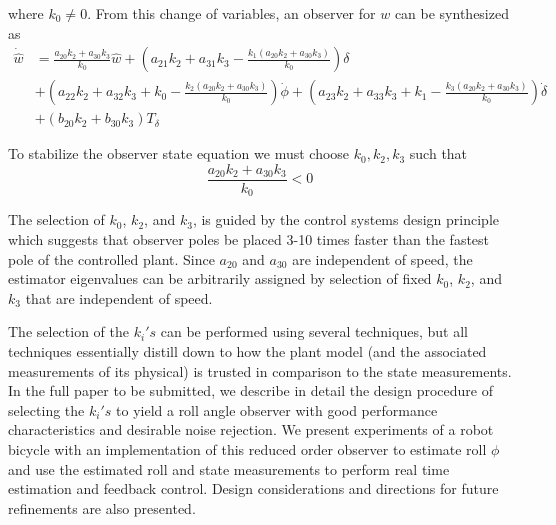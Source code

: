 \documentclass[letterpaper,11pt]{article}
\begin{document}
where $k_0\ne0$.  From this change of variables, an observer for $w$ can be
synthesized as
\begin{align*}
\dot{\hat{w}} &= \frac{a_{20} k_{2} + a_{30} k_{3}}{k_{0}} \hat{w}
 + \left(a_{21} k_{2} + a_{31} k_{3} - \frac{k_{1} \left(a_{20} k_{2} + a_{30} k_{3}\right)}{k_{0}}\right) \delta \\
 &+ \left(a_{22} k_{2} + a_{32} k_{3} + k_{0} - \frac{k_{2} \left(a_{20} k_{2} + a_{30} k_{3}\right)}{k_{0}}\right) \dot{\phi}
 + \left(a_{23} k_{2} + a_{33} k_{3} + k_{1} - \frac{k_{3} \left(a_{20} k_{2} + a_{30} k_{3}\right)}{k_{0}}\right) \dot{\delta} \\
 &+ \left(b_{20} k_{2} + b_{30} k_{3}\right) T_\delta
\end{align*}

To stabilize the observer state equation we must choose $k_0, k_2, k_3$ such
that
\begin{equation*}
\frac{a_{20} k_{2} + a_{30} k_{3}}{k_{0}} < 0
\end{equation*}

The selection of $k_0$, $k_2$, and $k_3$, is guided by the control systems
design principle which suggests that observer poles be placed 3-10 times faster
than the fastest pole of the controlled plant. Since $a_{20}$ and $a_{30}$ are
independent of speed, the estimator eigenvalues can be arbitrarily assigned by
selection of fixed $k_0$, $k_2$, and $k_3$ that are independent of speed.

The selection of the $k_i's$ can be performed using several techniques, but all
techniques essentially distill down to how the plant model (and the associated
measurements of its physical) is trusted in comparison to the state
measurements. In the full paper to be submitted, we describe in detail the
design procedure of selecting the $k_i's$ to yield a roll angle observer with
good performance characteristics and desirable noise rejection.  We present
experiments of a robot bicycle with an implementation of this reduced order
observer to estimate roll $\phi$ and use the estimated roll and state
measurements to perform real time estimation and feedback control.  Design
considerations and directions for future refinements are also presented.




\end{document}
